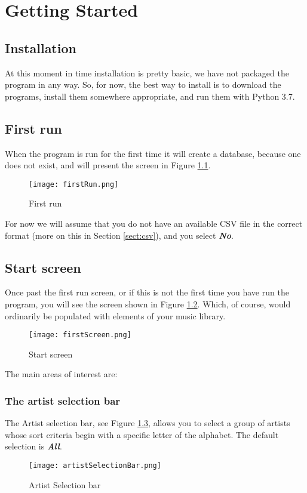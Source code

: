\chapter{Getting Started}
\section{Installation}
At this moment in time installation is pretty basic, we have not packaged the program in any way.  So, for now, the best way to install is to download the programs, install them somewhere appropriate, and run them with Python 3.7.
 
\section{First run}
When the program is run for the first time it will create a database, because one does not exist, and will present the screen in Figure 
\ref{fig:First run}.
\begin{figure}[!h]
  \texttt{[image: firstRun.png]}
  \caption{First run}
  \label{fig:First run}
\end{figure}
For now we will assume that you do not have an available CSV file in the correct format (more on this in Section 
\ref{sect:csv}),
and you select 
\textbf{\textit{No}}.


\section{Start screen}
Once past the first run screen, or if this is not the first time you have run the program, you will see the screen shown in Figure 
\ref{fig:Start screen}.
Which, of course, would ordinarily be populated with elements of your music library.
\begin{figure}[!h]
  \texttt{[image: firstScreen.png]}
  \caption{Start screen}
  \label{fig:Start screen}
\end{figure}
The main areas of interest are:

\subsection{The artist selection bar}
The Artist selection bar, see Figure 
\ref{fig:Artist Selection bar},
allows you to select a group of artists whose sort criteria begin with a specific letter of the alphabet.  The default selection is 
\textbf{\textit{All}}.
\begin{figure}[!h]
  \texttt{[image: artistSelectionBar.png]}
  \caption{Artist Selection bar}
  \label{fig:Artist Selection bar}
\end{figure}

